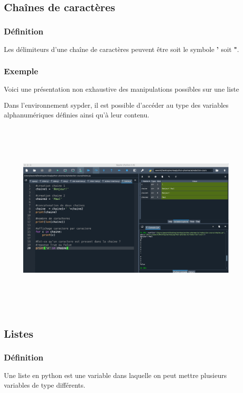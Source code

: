 \documentclass[a4paper,12pt]{article}
\begin{document}
\clearpage
\subsection{Cha\^ines de caractères}
\subsubsection{Définition}
Les délimiteurs d'une cha\^ine de caractères peuvent être soit le symbole \textbf{'} soit \textbf{"}.
\subsubsection{Exemple}
Voici une présentation non exhaustive des manipulations possibles sur une liste 


Dans l'environnement sypder, il est possible d'accéder au type des variables alphanumériques définies ainsi qu'à leur contenu.
\begin{figure}[h]
\begin{center}
\includegraphics[height=10cm]{./png/chaine.png}
\end{center}
\end{figure}


\clearpage
\subsection{Listes}
\subsubsection{Définition}
Une liste en python est une  variable dans laquelle on peut mettre plusieurs variables de type différents.
\end{document}
